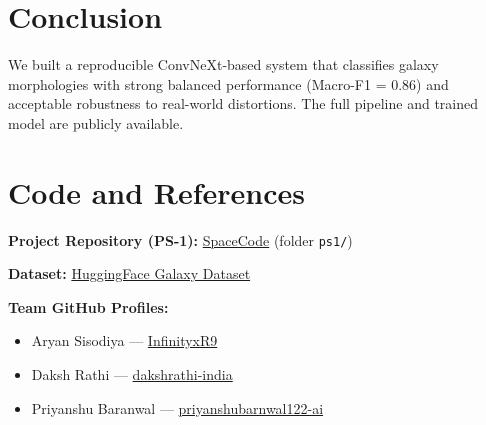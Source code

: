 \documentclass[11pt,a4paper]{article}
\begin{document}
\section{Conclusion}
We built a reproducible ConvNeXt-based system that classifies galaxy morphologies with strong balanced performance
(Macro-F1 = 0.86) and acceptable robustness to real-world distortions. The full pipeline and trained model are
publicly available.

\section*{Code and References}
\textbf{Project Repository (PS-1):}
\href{https://github.com/InfinityxR9/SpaceCode}{SpaceCode} (folder \texttt{ps1/})

\textbf{Dataset:}
\href{https://huggingface.co/datasets/Xanadu00/autotrain-data-galaxy_classification}{HuggingFace Galaxy Dataset}

\textbf{Team GitHub Profiles:}
\begin{itemize}
\item Aryan Sisodiya — \href{https://github.com/InfinityxR9}{InfinityxR9}
\item Daksh Rathi — \href{https://github.com/dakshrathi-india}{dakshrathi-india}
\item Priyanshu Baranwal — \href{https://github.com/priyanshubarnwal122-ai}{priyanshubarnwal122-ai}
\end{itemize}
\end{document}
